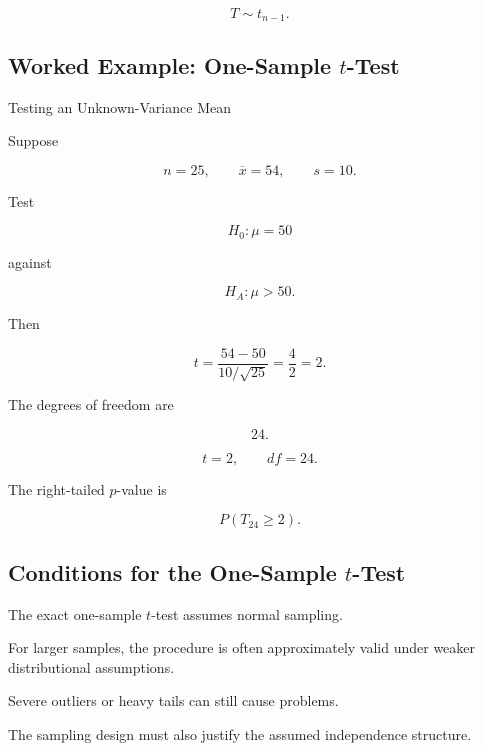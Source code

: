 \[
\boxed{
T
\sim
t_{n-1}.
}
\]

\subsection{Worked Example: One-Sample \(t\)-Test}
\label{subsec:worked-one-sample-t-test}

\begin{workedexamplebox}{Testing an Unknown-Variance Mean}

Suppose

\[
n=25,
\qquad
\overline{x}=54,
\qquad
s=10.
\]

Test

\[
H_0:\mu=50
\]

against

\[
H_A:\mu>50.
\]

Then

\[
t
=
\frac{
54-50
}{
10/\sqrt{25}
}
=
\frac4{2}
=
2.
\]

The degrees of freedom are

\[
24.
\]

\begin{answerbox}
\[
\boxed{
t=2,
\qquad
df=24.
}
\]

The right-tailed \(p\)-value is

\[
\boxed{
P(T_{24}\geq2).
}
\]
\end{answerbox}

\end{workedexamplebox}

\subsection{Conditions for the One-Sample \(t\)-Test}
\label{subsec:t-test-conditions}

The exact one-sample \(t\)-test assumes normal sampling.

For larger samples, the procedure is often approximately valid under
weaker distributional assumptions.

Severe outliers or heavy tails can still cause problems.

The sampling design must also justify the assumed independence structure.

